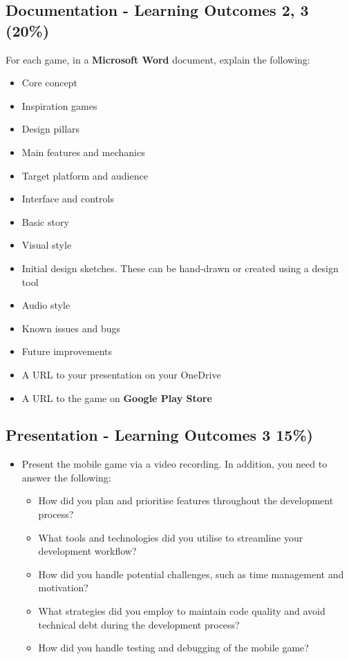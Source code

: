 \documentclass{article}
\begin{document}
\subsection*{Documentation - Learning Outcomes 2, 3 (20\%)}
\begin{itemize}
	For each game, in a \textbf{Microsoft Word} document, explain the following:
	\begin{itemize}
		\item Core concept
		\item Inspiration games
		\item Design pillars
		\item Main features and mechanics
		\item Target platform and audience
		\item Interface and controls
		\item Basic story
		\item Visual style
		\item Initial design sketches. These can be hand-drawn or created using a design tool
		\item Audio style
		\item Known issues and bugs
		\item Future improvements
		\item A URL to your presentation on your OneDrive
		\item A URL to the game on \textbf{Google Play Store}
	\end{itemize}
\end{itemize}

\subsection*{Presentation - Learning Outcomes 3 15\%)}
\begin{itemize}
	\item Present the mobile game via a video recording. In addition, you need to answer the following:
	\begin{itemize}
		\item How did you plan and prioritise features throughout the development process?
		\item What tools and technologies did you utilise to streamline your development workflow?
		\item How did you handle potential challenges, such as time management and motivation?
		\item What strategies did you employ to maintain code quality and avoid technical debt during the development process?
		\item How did you handle testing and debugging of the mobile game?
	\end{itemize}
\end{itemize}
\end{document}
